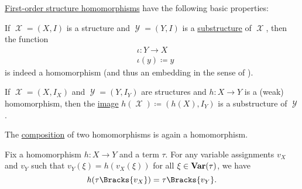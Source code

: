 \begin{proposition}\label{thm:def:first_order_homomorphism}
  \hyperref[def:first_order_homomorphism]{First-order structure homomorphisms} have the following basic properties:
  \begin{thmenum}
     If \( \mscrX = (X, I) \) is a structure and \( \mscrY = (Y, I) \) is a \hyperref[def:first_order_substructure]{substructure} of \( \mscrX \), then the  function
    \begin{equation}\label{thm:def:first_order_homomorphism/submodel/canonical_embedding}
      \begin{aligned}
        &\iota: Y \to X \\
        &\iota(y) \coloneqq y
      \end{aligned}
    \end{equation}
    is indeed a homomorphism (and thus an embedding in the sense of ).

     If \( \mscrX = (X, I_X) \) and \( \mscrY = (Y, I_Y) \) are structures and \( h: X \to Y \) is a (weak) homomorphism, then the \hyperref[def:multi_valued_function/image]{image} \( h(\mscrX) \coloneqq (h(X), I_Y) \) is a substructure of \( \mscrY \).

     The \hyperref[def:multi_valued_function/composition]{composition} of two homomorphisms is again a homomorphism.

     Fix a homomorphism \( h: X \to Y \) and a term \( \tau \). For any variable assignments \( v_X \) and \( v_Y \) such that \( v_Y(\xi) = h(v_X(\xi)) \) for all \( \xi \in \operatorname{\mathbf{Var}}(\tau) \), we have
    \begin{equation*}
      h(\tau\Bracks{v_X}) = \tau\Bracks{v_Y}.
    \end{equation*}
  \end{thmenum}
\end{proposition}
